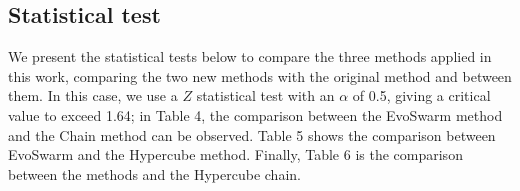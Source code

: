\documentclass[runningheads]{llncs}
\begin{document}
\subsection{Statistical test}
We present the statistical tests below to compare the three methods applied in this work, comparing the two new methods with the original method and between them. In this case, we use a \(Z\) statistical test with an $\alpha$ of 0.5, giving a critical value to exceed 1.64; in Table 4, the comparison between the EvoSwarm method and the Chain method can be observed. Table 5 shows the comparison between EvoSwarm and the Hypercube method. Finally, Table 6 is the comparison between the methods and the Hypercube chain.\hfill \break
\begin{table}[H]
\caption{Statistical comparison for EvoSwarm vs Chain method, positive test results are in bold}
\end{table}
\end{document}
